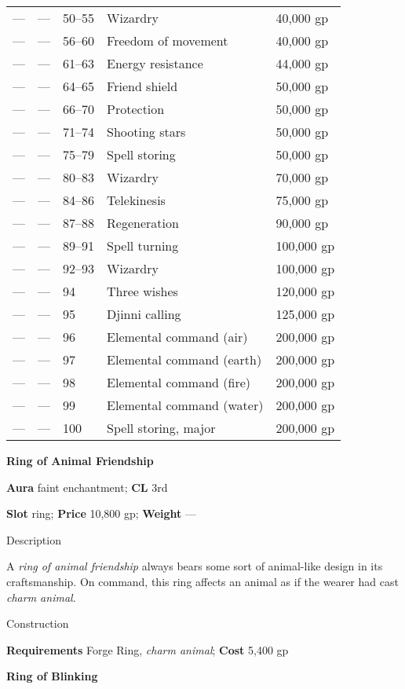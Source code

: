 \begin{table}[]
\begin{tabular}{lllll}
 — & — & 50–55 & Wizardry & 40,000 gp \\
 — & — & 56–60 & Freedom of movement & 40,000 gp \\
 — & — & 61–63 & Energy resistance & 44,000 gp \\
 — & — & 64–65 & Friend shield & 50,000 gp \\
 — & — & 66–70 & Protection & 50,000 gp \\
 — & — & 71–74 & Shooting stars & 50,000 gp \\
 — & — & 75–79 & Spell storing & 50,000 gp \\
 — & — & 80–83 & Wizardry & 70,000 gp \\
 — & — & 84–86 & Telekinesis & 75,000 gp \\
 — & — & 87–88 & Regeneration & 90,000 gp \\
 — & — & 89–91 & Spell turning & 100,000 gp \\
 — & — & 92–93 & Wizardry & 100,000 gp \\
 — & — & 94 & Three wishes & 120,000 gp \\
 — & — & 95 & Djinni calling & 125,000 gp \\
 — & — & 96 & Elemental command (air) & 200,000 gp  \\
 — & — & 97 & Elemental command (earth) & 200,000 gp \\
 — & — & 98 & Elemental command (fire) & 200,000 gp \\
 — & — & 99 & Elemental command (water) & 200,000 gp \\
 — & — & 100 & Spell storing, major & 200,000 gp\\
\end{tabular}
\end{table}

\textbf{Ring of Animal Friendship}
				
\textbf{Aura} faint enchantment;\textbf{ CL }3rd
				
\textbf{Slot} ring; \textbf{Price} 10,800 gp; \textbf{Weight} ---
				
Description
				
A \textit{ring of animal friendship} always bears some sort of animal-like design in its craftsmanship. On command, this ring affects an animal as if the wearer had cast \textit{charm animal}. 
				
Construction
				
\textbf{Requirements} Forge Ring, \textit{charm animal}; \textbf{Cost }5,400 gp
				
\textbf{Ring of Blinking}
				
